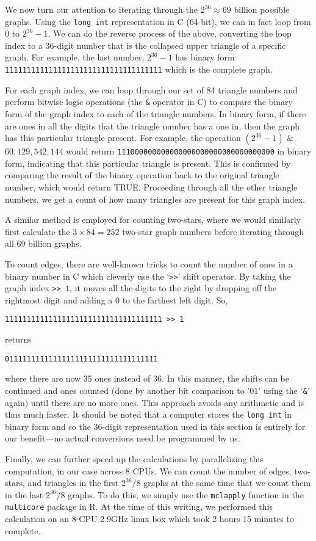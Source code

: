 We now turn our attention to iterating through the $2^{36} \approx 69$ billion possible graphs.  
Using the \texttt{long int} representation in C (64-bit), 
we can in fact loop from 0 to $2^{36}-1$.  
We can do the reverse process of the above, converting the loop index to a 36-digit 
number that is the collapsed upper triangle of a specific graph.
For example, the last number, $2^{36}-1$ has binary form 
\texttt{111111111111111111111111111111111111} which 
 is the complete graph.
   
For each graph index, we can loop through our set of 84 triangle numbers
and perform bitwise logic operations (the \texttt{\&} operator in C) to 
compare the binary form of the graph index to each of the triangle numbers.  
In binary form, if there are ones in all the digits that the triangle number has a 
one in, 
then the graph has this particular triangle present.
For example, the operation $(2^{36}-1)$ \& $60,129,542,144$ would return 
\texttt{111000000000000000000000000000000000} in binary form, indicating that this 
particular triangle is present.  This is confirmed by comparing the
result of the binary operation back to the original triangle number,
which would return TRUE.  Proceeding through all the other triangle numbers, 
we get a count of how many triangles are present for this graph index.

A similar method is employed for counting two-stars, where we would similarly
first calculate the $3\times84 = 252$ two-star graph numbers before iterating
through all 69 billion graphs.

To count edges, there are well-known tricks to count the number of ones 
in a binary number in C which cleverly use the `\texttt{>>}' shift operator.
By taking the graph index \texttt{>> 1}, it moves all the digits to the 
right by dropping off the rightmost digit and adding a 0 to the 
farthest left digit.  So, 
\begin{verbatim}
111111111111111111111111111111111111 >> 1
\end{verbatim}
returns 
\begin{verbatim}
01111111111111111111111111111111111 
\end{verbatim}
where there are now 35 ones instead of 36.  
In this manner, the shifts can be continued and ones counted 
(done by another bit comparison to '01' using the `\texttt{\&}' again) 
until there are no more ones.  This approach avoids any arithmetic and is thus much faster.  
It should be noted that a computer stores the \texttt{long int} in binary form 
and so the 36-digit representation used in this section is entirely for our benefit---no actual conversions need be programmed by us.

Finally, we can further speed up the calculations by parallelizing this computation,
in our case across 8 CPUs.  
We can count the number of edges, two-stars, and triangles in the 
first $2^{36}/8$ graphs at the same time that we count them in the last $2^{36}/8$ graphs.  
To do this, we simply use the \texttt{mclapply} function in the \texttt{multicore} \citep{multicore:R} 
package in R.
At the time of this writing, we performed this calculation on an 8-CPU 2.9GHz linux box
which took 2 hours 15 minutes to complete.  




